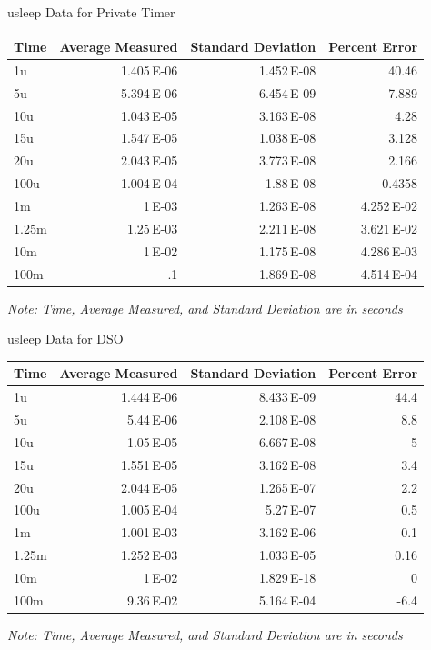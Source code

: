 \documentclass[pdf]{beamer}
\begin{document}
\begin{frame}{usleep Data for Private Timer}
  \begin{center}
    \begin{tabular}{lrrr}
      Time & Average Measured & Standard Deviation & Percent Error\\
      \hline
      1u & 1.405\,E-06 & 1.452\,E-08 & 40.46\\
      5u & 5.394\,E-06 & 6.454\,E-09 & 7.889\\
      10u & 1.043\,E-05 & 3.163\,E-08 & 4.28\\
      15u & 1.547\,E-05 & 1.038\,E-08 & 3.128\\
      20u & 2.043\,E-05 & 3.773\,E-08 & 2.166\\
      100u & 1.004\,E-04 & 1.88\,E-08 & 0.4358\\
      1m & 1\,E-03 & 1.263\,E-08 & 4.252\,E-02\\
      1.25m & 1.25\,E-03 & 2.211\,E-08 & 3.621\,E-02\\
      10m & 1\,E-02 & 1.175\,E-08 & 4.286\,E-03\\
      100m & .1 & 1.869\,E-08 & 4.514\,E-04\\
      \hline
    \end{tabular}
  \end{center}
  \small\emph{Note: Time, Average Measured, and Standard Deviation are in seconds}
\end{frame}

\begin{frame}{usleep Data for DSO}
  \begin{center}
    \begin{tabular}{lrrr}
      Time & Average Measured & Standard Deviation & Percent Error\\
      \hline
      1u & 1.444\,E-06 & 8.433\,E-09 & 44.4\\
      5u & 5.44\,E-06 & 2.108\,E-08 & 8.8\\
      10u & 1.05\,E-05 & 6.667\,E-08 & 5\\
      15u & 1.551\,E-05 & 3.162\,E-08 & 3.4\\
      20u & 2.044\,E-05 & 1.265\,E-07 & 2.2\\
      100u & 1.005\,E-04 & 5.27\,E-07 & 0.5\\
      1m & 1.001\,E-03 & 3.162\,E-06 & 0.1\\
      1.25m & 1.252\,E-03 & 1.033\,E-05 & 0.16\\
      10m & 1\,E-02 & 1.829\,E-18 & 0\\
      100m & 9.36\,E-02 & 5.164\,E-04 & -6.4\\
      \hline
    \end{tabular}
  \end{center}
  \small\emph{Note: Time, Average Measured, and Standard Deviation are in seconds}
\end{frame}
\end{document}
